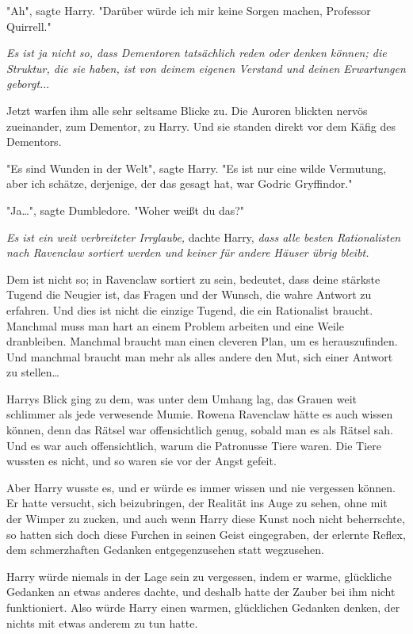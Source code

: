 {"Ah", sagte Harry. "Darüber würde ich mir keine Sorgen machen, Professor Quirrell."

\emph{Es ist ja nicht so, dass Dementoren tatsächlich reden oder denken können; die Struktur, die sie haben, ist von deinem eigenen Verstand und deinen Erwartungen geborgt.}..

Jetzt warfen ihm alle sehr seltsame Blicke zu. Die Auroren blickten nervös zueinander, zum Dementor, zu Harry. Und sie standen direkt vor dem Käfig des Dementors.

"Es sind Wunden in der Welt", sagte Harry. "Es ist nur eine wilde Vermutung, aber ich schätze, derjenige, der das gesagt hat, war Godric Gryffindor."

"Ja…", sagte Dumbledore. "Woher weißt du das?"

\emph{Es ist ein weit verbreiteter Irrglaube,} dachte Harry, \emph{dass alle besten Rationalisten nach Ravenclaw sortiert werden und keiner für andere Häuser übrig bleibt.}

Dem ist nicht so; in Ravenclaw sortiert zu sein, bedeutet, dass deine stärkste Tugend die Neugier ist, das Fragen und der Wunsch, die wahre Antwort zu erfahren. Und dies ist nicht die einzige Tugend, die ein Rationalist braucht. Manchmal muss man hart an einem Problem arbeiten und eine Weile dranbleiben. Manchmal braucht man einen cleveren Plan, um es herauszufinden. Und manchmal braucht man mehr als alles andere den Mut, sich einer Antwort zu stellen…

Harrys Blick ging zu dem, was unter dem Umhang lag, das Grauen weit schlimmer als jede verwesende Mumie. Rowena Ravenclaw hätte es auch wissen können, denn das Rätsel war offensichtlich genug, sobald man es als Rätsel sah. Und es war auch offensichtlich, warum die Patronusse Tiere waren. Die Tiere wussten es nicht, und so waren sie vor der Angst gefeit.

Aber Harry wusste es, und er würde es immer wissen und nie vergessen können. Er hatte versucht, sich beizubringen, der Realität ins Auge zu sehen, ohne mit der Wimper zu zucken, und auch wenn Harry diese Kunst noch nicht beherrschte, so hatten sich doch diese Furchen in seinen Geist eingegraben, der erlernte Reflex, dem schmerzhaften Gedanken entgegenzusehen statt wegzusehen.

Harry würde niemals in der Lage sein zu vergessen, indem er warme, glückliche Gedanken an etwas anderes dachte, und deshalb hatte der Zauber bei ihm nicht funktioniert. Also würde Harry einen warmen, glücklichen Gedanken denken, der nichts mit etwas anderem zu tun hatte.

}
